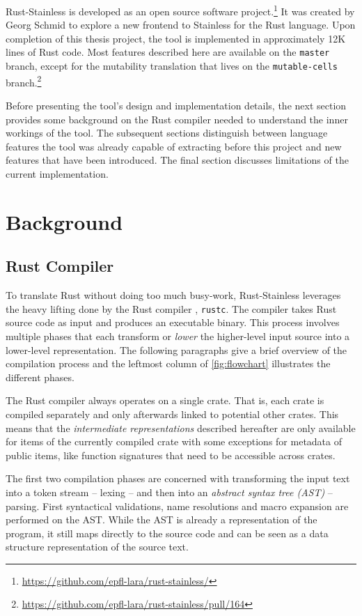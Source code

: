 Rust-Stainless is developed as an open source software
project.\footnote{\url{https://github.com/epfl-lara/rust-stainless/}} It was
created by Georg Schmid to explore a new frontend to Stainless for the Rust
language. Upon completion of this thesis project, the tool is implemented in
approximately 12K lines of Rust code. Most features described here are available
on the \lstinline!master! branch, except for the mutability translation that
lives on the \lstinline!mutable-cells!
branch.\footnote{\url{https://github.com/epfl-lara/rust-stainless/pull/164}}

Before presenting the tool's design and implementation details, the next section
provides some background on the Rust compiler needed to understand the inner
workings of the tool. The subsequent sections distinguish between language
features the tool was already capable of extracting before this project and new
features that have been introduced. The final section discusses limitations of
the current implementation.


\section{Background}

\subsection{Rust Compiler}

To translate Rust without doing too much busy-work, Rust-Stainless leverages the
heavy lifting done by the Rust compiler \cite{rustc-guide}, \lstinline!rustc!.
The compiler takes Rust source code as input and produces an executable binary.
This process involves multiple phases that each transform or \emph{lower} the
higher-level input source into a lower-level representation. The following
paragraphs give a brief overview of the compilation process and the leftmost
column of \autoref{fig:flowchart} illustrates the different phases.

The Rust compiler always operates on a single crate. That is, each crate is
compiled separately and only afterwards linked to potential other crates. This
means that the \emph{intermediate representations} described hereafter are only
available for items of the currently compiled crate with some exceptions for
metadata of public items, like function signatures that need to be accessible
across crates.

The first two compilation phases are concerned with transforming the input text
into a token stream -- lexing -- and then into an \emph{abstract syntax tree
(AST)} -- parsing. First syntactical validations, name resolutions and macro
expansion are performed on the AST. While the AST is already a representation of
the program, it still maps directly to the source code and can be seen as a data
structure representation of the source text.

